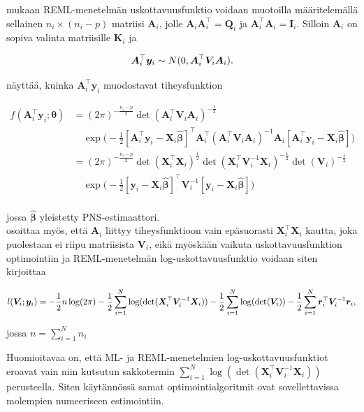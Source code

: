 \documentclass[finnish]{docopts}
\begin{document}
\cite{nissinen09} mukaan REML-menetelmän uskottavuusfunktio voidaan muotoilla määritelemällä sellainen $n_i \times (n_i - p)$ matriisi $\bm{A}_i$, jolle $\bm{A}_i \bm{A}_i^\top = \bm{Q}_i$ ja $\bm{A}_{i}^\top \bm{A}_i = \bm{I}_i$. Silloin $\bm{A}_i$ on sopiva valinta matriisille $\bm{K}_i$ ja 

$$
\bm{A}_{i}^\top \bm{y}_i \sim N(0, \bm{A}_{i}^\top \bm{V}_i \bm{A}_{i}).\\
$$

\cite{nissinen09} näyttää, kuinka $\bm{A}_{i}^\top \bm{y}_i$ muodostavat tiheysfunktion

$$
\begin{aligned}
f(\bm{A}_{i}^\top \bm{y}_i;\bm{\theta}) &= (2\pi)^{-\frac{n_{i}-p}{2}} \det (\bm{A}_{i}^\top \bm{V}_i \bm{A}_{i})^{-\frac{1}{2}} \\
&\quad \exp \big( -\frac{1}{2} [\bm{A}_{i}^\top \bm{y}_i - \bm{X}_i \bm{\hat{\beta}}]^\top \bm{A}_{i}^\top(\bm{A}_{i}^\top \bm{V}_i \bm{A}_{i})^{-1} \bm{A}_{i} [\bm{A}_{i}^\top \bm{y}_i - \bm{X}_i \hat{\bm{\beta}}]\big) \\
&= (2\pi)^{-\frac{n_{i}-p}{2}} \det(\bm{X}_{i}^\top \bm{X}_i)^{\frac{1}{2}} \det (\bm{X}_{i}^\top \bm{V}_{i}^{-1} \bm{X}_{i})^{-\frac{1}{2}} \det(\bm{V}_{i})^{-\frac{1}{2}} \\
&\quad \exp \big( -\frac{1}{2} [\bm{y}_i - \bm{X}_i \bm{\hat{\beta}}]^\top \bm{V}_{i}^{-1} [\bm{y}_i - \bm{X}_i \hat{\bm{\beta}}]\big) \\
\end{aligned}
$$

jossa $\bm{\hat{\beta}}$ yleistetty PNS-estimaattori.\\ 

\cite{nissinen09} osoittaa myös, että $\bm{A}_i$ liittyy tiheysfunktioon vain epäsuorasti $\bm{X}_{i}^\top \bm{X}_i$ kautta, joka puolestaan ei riipu matriisista $\bm{V}_i$, eikä myöskään vaikuta uskottavuusfunktion optimointiin ja REML-menetelmän log-uskottavuusfunktio voidaan siten kirjoittaa

$$
l(\bm{V}_i;\bm{y}_i) = -\frac{1}{2} n \log (2\pi) -\frac{1}{2} \sum\limits_{i=1}^{N} \log (\det (\bm{X}_{i}^\top \bm{V}_{i}^{-1} \bm{X}_{i})) -\frac{1}{2} \sum\limits_{i=1}^{N} \log (\det (\bm{V}_{i})) -\frac{1}{2} \sum\limits_{i=1}^{N} \bm{r}_{i}^\top \bm{V}_i^{-1} \bm{r}_{i}, \\
$$

jossa $n = \sum\limits_{i=1}^{N} n_i$

Huomioitavaa on, että ML- ja REML-menetelmien log-uskottavuusfunktiot eroavat vain niin kutsutun sakkotermin $\sum\limits_{i=1}^{N} \log (\det (\bm{X}_{i}^\top \bm{V}_{i}^{-1} \bm{X}_{i}))$ perusteella. Siten käytännössä samat optimointialgoritmit ovat sovellettavissa molempien numeeriseen estimointiin. \\
\end{document}
